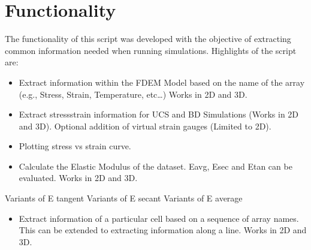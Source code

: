 \documentclass[letterpaper,10pt,english]{sphinxmanual}
\let\sphinxpxdimen\pdfpxdimen\else\newdimen\sphinxpxdimen
\begin{document}
\section{Functionality}
\label{\detokenize{postprocessing_intro:functionality}}
\sphinxAtStartPar
The functionality of this script was developed with the objective of extracting common information needed when running simulations. Highlights of the script are:
\begin{itemize}
\item {} 
\sphinxAtStartPar
Extract information within the FDEM Model based on the name of the array (e.g., Stress, Strain, Temperature, etc…) Works in 2D and 3D.

\item {} 
\sphinxAtStartPar
Extract stress\sphinxhyphen{}strain information for UCS and BD Simulations (Works in 2D and 3D). Optional addition of virtual strain gauges (Limited to 2D).

\item {} 
\sphinxAtStartPar
Plotting stress vs strain curve.

\end{itemize}

\noindent{\hspace*{\fill}\sphinxincludegraphics[width=250\sphinxpxdimen]{{stress_strain}.png}\hspace*{\fill}}
\begin{itemize}
\item {} 
\sphinxAtStartPar
Calculate the Elastic Modulus of the dataset. Eavg, Esec and Etan can be evaluated. Works in 2D and 3D.

\end{itemize}

\begin{sphinxVerbatim}[commandchars=\\\{\}]
Variants of E tangent
Variants of E secant
Variants of E average
\end{sphinxVerbatim}
\begin{itemize}
\item {} 
\sphinxAtStartPar
Extract information of a particular cell based on a sequence of array names. This can be extended to extracting information along a line. Works in 2D and 3D.

\end{itemize}
\end{document}
